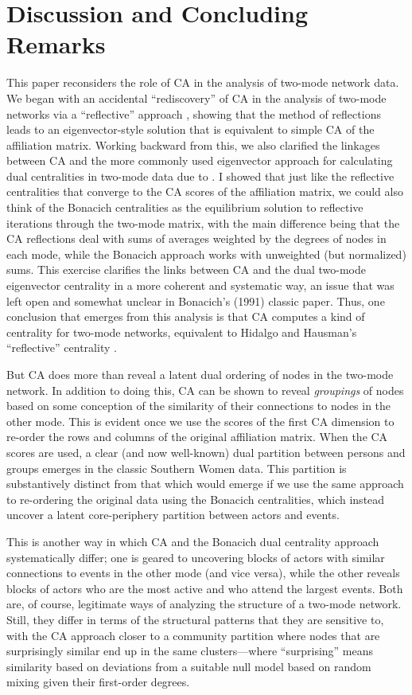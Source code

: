 \documentclass[a4paper,fleqn]{cas-sc}
\begin{document}
\section{Discussion and Concluding Remarks} \label{sec:disc}
This paper reconsiders the role of CA in the analysis of two-mode network data. We began with an accidental ``rediscovery'' of CA in the analysis of two-mode networks via a ``reflective'' approach \citep{hidalgo2009building}, showing that the method of reflections leads to an eigenvector-style solution that is equivalent to simple CA of the affiliation matrix. Working backward from this, we also clarified the linkages between CA and the more commonly used eigenvector approach for calculating dual centralities in two-mode data due to \citet{bonacich1991simultaneous}. I showed that just like the reflective centralities that converge to the CA scores of the affiliation matrix, we could also think of the Bonacich centralities as the equilibrium solution to reflective iterations through the two-mode matrix, with the main difference being that the CA reflections deal with sums of averages weighted by the degrees of nodes in each mode, while the Bonacich approach works with unweighted (but normalized) sums. This exercise clarifies the links between CA and the dual two-mode eigenvector centrality in a more coherent and systematic way, an issue that was left open and somewhat unclear in Bonacich's (1991) classic paper. Thus, one conclusion that emerges from this analysis is that CA computes a kind of centrality for two-mode networks, equivalent to Hidalgo and Hausman's ``reflective'' centrality \citep{van2021correspondence}.

But CA does more than reveal a latent dual ordering of nodes in the two-mode network. In addition to doing this, CA can be shown to reveal \textit{groupings} of nodes based on some conception of the similarity of their connections to nodes in the other mode. This is evident once we use the scores of the first CA dimension to re-order the rows and columns of the original affiliation matrix. When the CA scores are used, a clear (and now well-known) dual partition between persons and groups emerges in the classic Southern Women data. This partition is substantively distinct from that which would emerge if we use the same approach to re-ordering the original data using the Bonacich centralities, which instead uncover a latent core-periphery partition between actors and events. 

This is another way in which CA and the Bonacich dual centrality approach systematically differ; one is geared to uncovering blocks of actors with similar connections to events in the other mode (and vice versa), while the other reveals blocks of actors who are the most active and who attend the largest events. Both are, of course, legitimate ways of analyzing the structure of a two-mode network. Still, they differ in terms of the structural patterns that they are sensitive to, with the CA approach closer to a community partition where nodes that are surprisingly similar end up in the same clusters---where ``surprising'' means similarity based on deviations from a suitable null model based on random mixing given their first-order degrees. 
\end{document}
